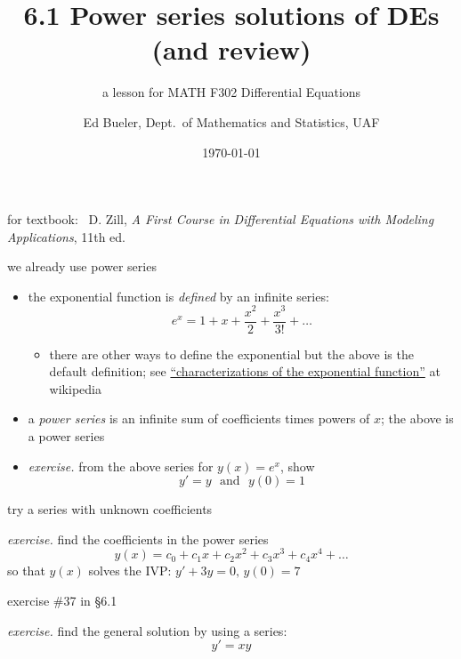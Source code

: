 \documentclass[urlcolor=blue,dvipsnames]{beamer}
\title{6.1 Power series solutions of DEs \\ (and review)}
\subtitle{a lesson for MATH F302 Differential Equations}
\author{Ed Bueler, Dept.~of Mathematics and Statistics, UAF}
\date{\tiny \today}
\begin{document}


\begin{frame}
\titlepage

\centerline{\tiny for textbook: \, D. Zill, \emph{A First Course in Differential Equations with Modeling Applications}, 11th ed.}
\end{frame}


\begin{frame}{we already use power series}

\begin{itemize}
\item the exponential function is \emph{defined} by an infinite series:
    $$e^x = 1 + x + \frac{x^2}{2} + \frac{x^3}{3!} + \dots$$
    \begin{itemize}
    \item there are other ways to define the exponential but the above is the default definition; see \href{https://en.wikipedia.org/wiki/Characterizations_of_the_exponential_function}{``characterizations of the exponential function''} at wikipedia
    \end{itemize}
\item a \emph{power series} is an infinite sum of coefficients times powers of $x$; the above is a power series
\item \emph{exercise.} from the above series for $y(x)=e^x$, show
    $$y'=y \,\, \text{ and } \,\, y(0)=1$$
\end{itemize}

\vspace{30mm}
\end{frame}


\begin{frame}{try a series with unknown coefficients}

\noindent \emph{exercise.}  find the coefficients in the power series
    $$y(x) = c_0 + c_1 x + c_2 x^2 + c_3 x^3 + c_4 x^4 + \dots$$
so that $y(x)$ solves the IVP: \quad $y'+3y=0, \, y(0) = 7$

\vspace{60mm}
\end{frame}


\begin{frame}{exercise \#37 in \S 6.1}

\noindent \emph{exercise.}  find the general solution by using a series:
    $$y'=xy$$

\vspace{70mm}
\end{frame}
\end{document}
